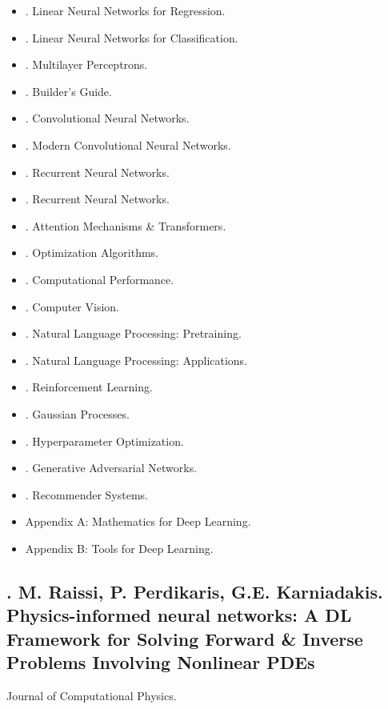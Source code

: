 \documentclass{article}
\begin{document}
\begin{enumerate}
\begin{itemize}
\begin{itemize}
\begin{itemize}
\begin{verbatim}
				\end{verbatim}
			\end{itemize}
		\end{itemize}
		\item {. Linear Neural Networks for Regression.}
		\item {. Linear Neural Networks for Classification.}
		\item {. Multilayer Perceptrons.}
		\item {. Builder's Guide.}
		\item {. Convolutional Neural Networks.}
		\item {. Modern Convolutional Neural Networks.}
		\item {. Recurrent Neural Networks.}
		\item {. Recurrent Neural Networks.}
		\item {. Attention Mechanisms \& Transformers.}
		\item {. Optimization Algorithms.}
		\item {. Computational Performance.}
		\item {. Computer Vision.}
		\item {. Natural Language Processing: Pretraining.}
		\item {. Natural Language Processing: Applications.}
		\item {. Reinforcement Learning.}
		\item {. Gaussian Processes.}
		\item {. Hyperparameter Optimization.}
		\item {. Generative Adversarial Networks.}
		\item {. Recommender Systems.}
		\item {\sf Appendix A: Mathematics for Deep Learning.}
		\item {\sf Appendix B: Tools for Deep Learning.}
	\end{itemize}	
\end{enumerate}

\subsection{\cite{Raissi_Perdikaris_Karniadakis2019}. {\sc M. Raissi, P. Perdikaris, G.E. Karniadakis}. Physics-informed neural networks: A DL Framework for Solving Forward \& Inverse Problems Involving Nonlinear PDEs}
Journal of Computational Physics. {\sf[12432 citations]}
\end{document}

